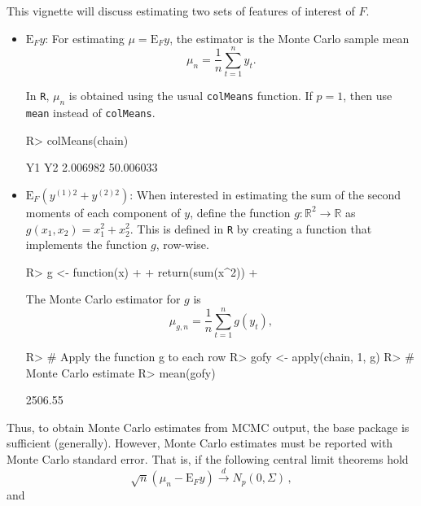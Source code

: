 \documentclass[11pt]{article}
\begin{document}
\bigskip
This vignette will discuss estimating two sets of features of interest of $F$.
\begin{itemize}
\item $\text{E}_F y$: For estimating $\mu = \text{E}_Fy$, the estimator is the Monte Carlo sample mean
\[ \mu_n = \dfrac{1}{n} \displaystyle \sum_{t=1}^{n} y_t.\]

In \texttt{R}, $\mu_n$ is obtained using the usual \texttt{colMeans} function. If $p = 1$, then use \texttt{mean} instead of \texttt{colMeans}.

\begin{Schunk}
\begin{Sinput}
R> colMeans(chain)
\end{Sinput}
\begin{Soutput}
       Y1        Y2 
 2.006982 50.006033 
\end{Soutput}
\end{Schunk}
  
\item $\text{E}_F \left(y^{(1)2} + y^{(2)2} \right)$: When interested in estimating the sum of the second moments of each component of $y$,  define the function $g: \mathbb{R}^2 \to \mathbb{R}$ as $g(x_1,x_2) = x_1^2 + x_2^2$. This is defined in \texttt{R} by creating a function that implements the function $g$, row-wise.

\begin{Schunk}
\begin{Sinput}
R> g <- function(x)
+ {
+   return(sum(x^2))
+ }
\end{Sinput}
\end{Schunk}

The Monte Carlo estimator for $g$ is 
\[ \mu_{g,n} = \dfrac{1}{n} \displaystyle \sum_{t=1}^{n} g(y_t),\]

\begin{Schunk}
\begin{Sinput}
R> # Apply the function g to each row
R> gofy <- apply(chain, 1, g)
R> # Monte Carlo estimate
R> mean(gofy)
\end{Sinput}
\begin{Soutput}
[1] 2506.55
\end{Soutput}
\end{Schunk}
\end{itemize}

Thus, to obtain Monte Carlo estimates from MCMC output, the base package is sufficient (generally). However, Monte Carlo estimates must be reported with Monte Carlo standard error. That is, if the following central limit theorems hold
\begin{equation}
\label{eq:clt}
\sqrt{n}(\mu_n - \text{E}_F y) \overset{d}{\to} N_p(0, \Sigma)\,,
\end{equation}
and
\end{document}
